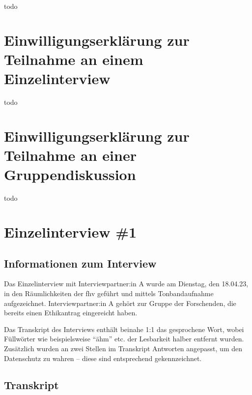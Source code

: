 \documentclass[a4paper,12pt,twoside]{scrreprt}
\begin{document}
todo



\chapter{Einwilligungserklärung zur Teilnahme an einem Einzelinterview}
\label{appendix:informed-consent-einzelinterview}

todo



\chapter{Einwilligungserklärung zur Teilnahme an einer Gruppendiskussion}
\label{appendix:informed-consent-gruppendiskussion}

todo



\chapter{Einzelinterview \#1}
\label{appendix:interview-1}

\section{Informationen zum Interview}
\label{appendix:interview-1-infos}

Das Einzelinterview mit Interviewpartner:in A wurde am Dienstag, den 18.04.23, in den Räumlichkeiten der \ac{fhv} geführt und mittels Tonbandaufnahme aufgezeichnet. Interviewpartner:in A gehört zur Gruppe der Forschenden, die bereits einen Ethikantrag eingereicht haben.

Das Transkript des Interviews enthält beinahe 1:1 das gesprochene Wort, wobei Füllwörter wie beispielsweise \enquote{ähm} etc. der Lesbarkeit halber entfernt wurden. Zusätzlich wurden an zwei Stellen im Transkript Antworten angepasst, um den Datenschutz zu wahren -- diese sind entsprechend gekennzeichnet.

\section{Transkript}
\label{appendix:interview-1-transkript}
\end{document}
